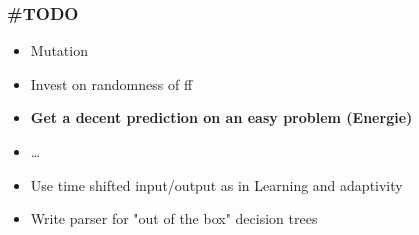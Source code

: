 \documentclass{beamer}
\begin{document}
\begin{frame}[fragile]
\frametitle{\#TODO}

\begin{itemize}
\item Mutation
\item Invest on randomness of ff
\item \textbf{Get a decent prediction on an easy problem (Energie)}
\item \dots
\item Use time shifted input/output as in Learning and adaptivity
\item Write parser for "out of the box" decision trees 
\end{itemize}


\end{frame}











%


%
\end{document}
